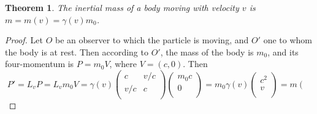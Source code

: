 \documentclass[12pt]{article}
\newtheorem{thm}{Theorem}
\theoremstyle{defn}
\theoremstyle{pf}
\newcommand{\0}{\emptyset}
\renewcommand{\-}{\setminus}
\begin{document}
\begin{thm}The inertial mass of a body moving with velocity $v$ is $m=m(v)=\gamma(v)m_0$.
\end{thm}
\begin{proof}
Let $O$ be an observer to which the particle is moving, and $O'$ one to whom the body is at rest. Then according to $O'$, the mass of the body is $m_0$, and its four-momentum is $P=m_0V$, where $V=(c,0)$. Then $$P'=L_vP=L_vm_0V=\gamma(v)\left(\begin{array}{cc}c & v/c\\
                                                                                                                                                            v/c & c\\                                                                                                                                                        \end{array}\right)\left(\begin{array}{c}
                                                                                                                                                                                                                                                                                                                                                    m_0c\\
0\\
                                                                                                                                                                                                                                                                                                                                                    \end{array}\right)=m_0\gamma(v)\left(\begin{array}{c}
                                                                                                                                                                                                                                                                                                                                                    c^2\\
v\\
                                                                                                                                                                                                                                                                                                                                                    \end{array}\right)=m\left(\begin{array}{c}

\end{array}$$
\end{proof}
\end{document}
